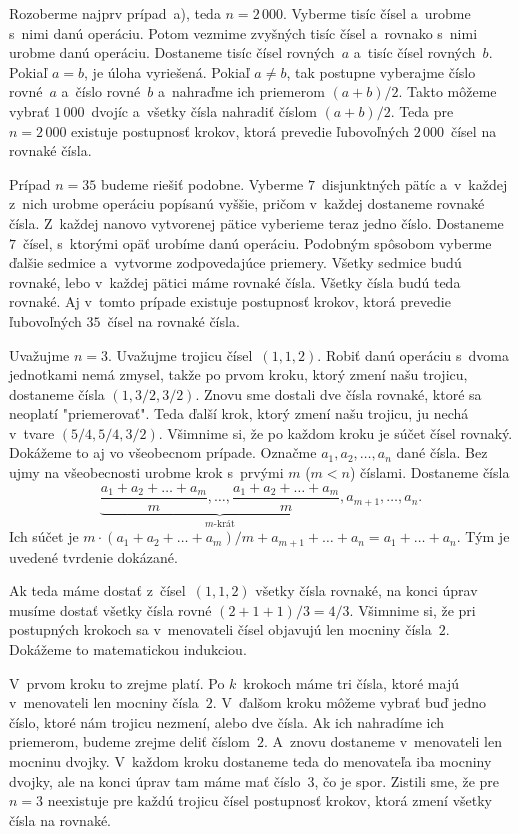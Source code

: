 {%
Rozoberme najprv prípad~a), teda $n = 2\,000$. Vyberme tisíc
čísel a~urobme s~nimi danú operáciu. Potom vezmime zvyšných
tisíc čísel a~rovnako s~nimi urobme danú operáciu. Dostaneme
tisíc čísel rovných~$a$ a~tisíc čísel rovných~$b$. Pokiaľ $a = b$,
je úloha vyriešená. Pokiaľ $a \ne b$, tak postupne vyberajme číslo
rovné~$a$ a~číslo rovné~$b$ a~nahraďme ich priemerom
$(a+b)/2$. Takto môžeme vybrať $1\,000$~dvojíc a~všetky
čísla nahradiť číslom $(a+b)/2$. Teda pre $n = 2\,000$
existuje postupnosť krokov, ktorá prevedie ľubovoľných
$2\,000$~čísel na rovnaké čísla.

Prípad $n = 35$ budeme riešiť podobne. Vyberme $7$~disjunktných
pätíc a~v~každej z~nich urobme operáciu popísanú vyššie, pričom
v~každej dostaneme rovnaké čísla. Z~každej nanovo vytvorenej pätice
vyberieme teraz jedno číslo. Dostaneme $7$~čísel, s~ktorými opäť
urobíme danú operáciu. Podobným spôsobom vyberme ďalšie sedmice
a~vytvorme zodpovedajúce priemery. Všetky sedmice budú rovnaké,
lebo v~každej pätici máme rovnaké čísla. Všetky čísla budú teda
rovnaké. Aj v~tomto prípade existuje postupnosť krokov, ktorá
prevedie ľubovoľných $35$~čísel na rovnaké čísla.

Uvažujme $n = 3$. Uvažujme trojicu čísel~$(1, 1, 2)$. Robiť
danú operáciu s~dvoma jednotkami nemá zmysel, takže po prvom
kroku, ktorý zmení našu trojicu, dostaneme čísla $(1, 3/2, 3/2)$.
Znovu sme dostali dve čísla rovnaké,
ktoré sa neoplatí "priemerovať". Teda ďalší krok, ktorý zmení
našu trojicu, ju nechá v~tvare $(5/4, 5/4,3/2)$. Všimnime si,
že po každom kroku je súčet čísel
rovnaký. Dokážeme to aj vo všeobecnom prípade. Označme $a_1, a_2,\dots,a_n$
dané čísla. Bez ujmy na všeobecnosti urobme krok
s~prvými $m$ ($m < n$) číslami. Dostaneme čísla
$$
\underbrace {\frac{a_1 + a_2 + \dots + a_m}{m},
\dots,\frac{a_1 + a_2 + \dots+ a_m}{m}}_{m\text{-krát}},
a_{m + 1},\dots,a_n.
$$
Ich súčet je $m\cdot (a_1 + a_2 + \dots + a_m)/m +
a_{m+1} + \dots + a_n = a_1 + \dots + a_n$. Tým je uvedené
tvrdenie dokázané.

Ak teda máme dostať z~čísel~$(1, 1, 2)$ všetky čísla rovnaké,
na konci úprav musíme dostať všetky čísla rovné $(2 + 1 + 1)/3 = 4/3$.
Všimnime si, že pri postupných krokoch sa
v~menovateli čísel objavujú len mocniny čísla~$2$. Dokážeme to
matematickou indukciou.

V~prvom kroku to zrejme platí. Po $k$~krokoch máme tri čísla,
ktoré majú v~menovateli len mocniny čísla~$2$. V~ďalšom kroku
môžeme vybrať buď jedno číslo, ktoré nám trojicu nezmení, alebo
dve čísla. Ak ich nahradíme ich priemerom, budeme zrejme deliť
číslom~$2$. A~znovu dostaneme v~menovateli len mocninu dvojky.
V~každom kroku dostaneme teda do menovateľa iba mocniny dvojky,
ale na konci úprav tam máme mať číslo~$3$, čo je spor. Zistili
sme, že pre $n = 3$ neexistuje pre každú trojicu čísel
postupnosť krokov, ktorá zmení všetky čísla na rovnaké.

}
